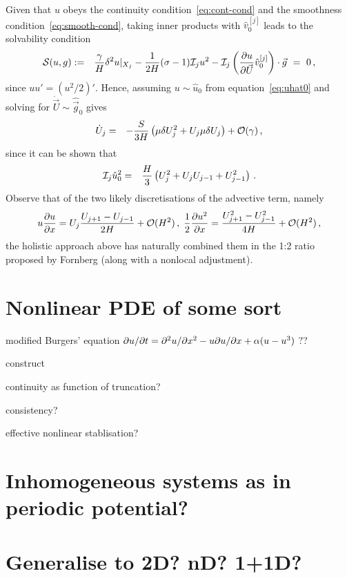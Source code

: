 \documentclass[12pt,a5paper]{article}
\begin{document}
Given that $u$ obeys the continuity condition~\eqref{eq:cont-cond} and the smoothness condition~\eqref{eq:smooth-cond}, taking inner products with $\hat{v}_0^{[j]}$ leads to the solvability condition
\begin{eqnarray}
       {\cal S}(u,g) & := & 
          \frac{\gamma}{H}\delta^2u|_{X_j} - \frac{1}{2H}(\sigma-1){\cal I}_j u^2
	-{\cal I}_j\left(\D {\vec U}u\hat{v}_0^{[j]}\right)\cdot\vec{g}~=~0 \,,
\label{eq:Sug}
\end{eqnarray}
since $uu'=(u^2/2)'$. %
Hence, assuming $u\sim\hat{u}_0$ from
equation~\eqref{eq:uhat0} and solving for $\dot{\vec{U}}\sim\hat{\vec{g}}_0$ gives
\begin{eqnarray}
	\dot{U}_j & = & 
- \frac{S}{3H}\left(\mu\delta U^2_j+U_j\mu\delta U_j\right)+{\cal O}(\gamma)\,,
\end{eqnarray}
since it can be shown that
\begin{eqnarray}
{\cal I}_j\hat{u}_0^2 & = & \frac{H}{3}\left(U_j^2+U_jU_{j-1}+U_{j-1}^2\right)\,.
\end{eqnarray}
Observe that of the two likely discretisations of the advective term, namely
\begin{eqnarray}
u\D xu = U_j\frac{U_{j+1}-U_{j-1}}{2H}+{\cal O}(H^2)\,,\;
\frac{1}{2}\D x{u^2} = \frac{U_{j+1}^2-U_{j-1}^2}{4H}+{\cal O}(H^2)\,,
\end{eqnarray}
the holistic approach above has naturally combined them in the 1:2 ratio proposed by Fornberg (along with a nonlocal adjustment).

\section{Nonlinear PDE of some sort}

modified Burgers' equation \(\D tu=\DD xu-u\D xu+\alpha(u-u^3)\) ??

construct

continuity as function of truncation?

consistency?

effective nonlinear stablisation?


\section{Inhomogeneous systems as in periodic potential?}


\section{Generalise to 2D? nD? 1+1D?}
\end{document}
